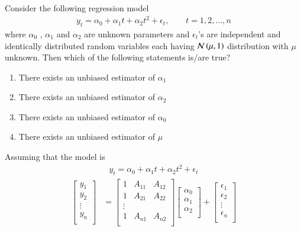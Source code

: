 \documentclass[journal,12pt,onecolumn]{IEEEtran}
\theoremstyle{remark}
\begin{document}



\maketitle



\bigskip

\renewcommand{\thefigure}{\theenumi}
\renewcommand{\thetable}{\theenumi}

Consider the following regression model
\begin{align}
y_t={\alpha}_0+{\alpha}_1t+{\alpha}_2t^2+\epsilon_{t}, \qquad t = 1,2,…,n
\end{align}
where ${\alpha}_0$ , ${\alpha}_1$ and ${\alpha}_2$ are unknown parameters and $\epsilon_{t}$’s are independent and identically distributed random variables each having $\mathcal{N}\left(\mu,1\right)$ distribution with $\mu$ unknown. Then which of the following statements is/are true?
\begin{enumerate}
\item{There exists an unbiased estimator of ${\alpha}_1$}
\item{There exists an unbiased estimator of ${\alpha}_2$}
\item{There exists an unbiased estimator of ${\alpha}_0$}
\item{There exists an unbiased estimator of ${\mu}$}
\end{enumerate}
\solution
Assuming that the model is 
\begin{align}
y_t={\alpha}_0+{\alpha}_1t+{\alpha}_2t^2+\epsilon_{t}
\end{align}
\begin{align}
\begin{bmatrix} 
	y_1  \\
	y_2 \\
	\vdots\\
	y_n  \\
\end{bmatrix}&=\begin{bmatrix} 
	1&A_{11}&A_{12}  \\
	1&A_{21}&A_{22}\\
	\vdots\\
	1&A_{n1}&A_{n2} \\
\end{bmatrix} \begin{bmatrix} 
	{\alpha}_0  \\
	{\alpha}_1 \\
	{\alpha}_2\\
\end{bmatrix}+\begin{bmatrix} 
	\epsilon_{1}  \\
	\epsilon_{2}  \\\vdots\\\epsilon_{n}  \\
\end{bmatrix}
\end{align}
\end{document}
